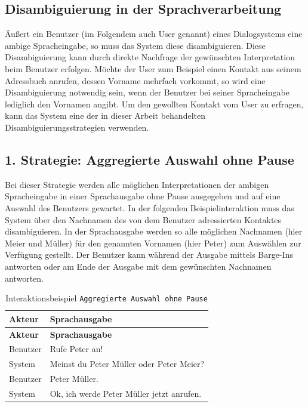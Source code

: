 \documentclass[12pt,a4paper]{scrartcl}
\begin{document}
\subsection{Disambiguierung in der Sprachverarbeitung}
Äußert ein Benutzer (im Folgendem auch User genannt) eines Dialogsystems eine ambige Spracheingabe, so muss das System diese disambiguieren. Diese Disambiguierung kann durch direkte Nachfrage der gewünschten Interpretation beim Benutzer erfolgen. 
Möchte der User zum Beispiel einen Kontakt aus seinem Adressbuch anrufen, dessen Vorname mehrfach vorkommt, so wird eine Disambiguierung notwendig sein, wenn der Benutzer bei seiner Spracheingabe lediglich den Vornamen angibt. Um den gewollten Kontakt vom User zu erfragen, kann das System eine der in dieser Arbeit behandelten Disambiguierungsstrategien verwenden. 
\subsection{1. Strategie: Aggregierte Auswahl ohne Pause}
Bei dieser Strategie werden alle möglichen Interpretationen der ambigen Spracheingabe in einer Sprachausgabe ohne Pause ausgegeben und auf eine Auswahl des Benutzers gewartet. In der folgenden  Beispielinteraktion muss das System über den Nachnamen des von dem Benutzer adressierten Kontaktes disambiguieren. In der Sprachausgabe werden so alle möglichen Nachnamen (hier Meier und Müller) für den genannten Vornamen (hier Peter) zum Auswählen zur Verfügung gestellt. Der Benutzer kann während der Ausgabe mittels Barge-Ins antworten oder am Ende der Ausgabe mit dem gewünschten Nachnamen antworten. 


\begin{longtable}{p{6cm}p{8cm}}
	\caption[Interaktionsbeispiel \texttt{Aggregierte Auswahl ohne Pause}]{Interaktionsbeispiel \texttt{Aggregierte Auswahl ohne Pause}}\\
	\hline
	\textbf{Akteur} &	\textbf{Sprachausgabe}\\
	\hline
	\endfirsthead
	\hline
	\textbf{Akteur} &	\textbf{Sprachausgabe}\\
	\hline
	\endhead
Benutzer & Rufe Peter an!\\
System & Meinst du Peter Müller oder Peter Meier?\\
Benutzer & Peter Müller.\\
System & Ok, ich werde Peter Müller jetzt anrufen.\\

\hline
\end{longtable}
	
\end{document}
